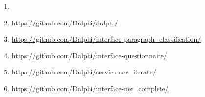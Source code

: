   \begin{enumerate}
    \item {}
    \item \url{https://github.com/Dalphi/dalphi/} \\
    \item \url{https://github.com/Dalphi/interface-paragraph_classification/} \\
    \item \url{https://github.com/Dalphi/interface-questionnaire/} \\
    \item \url{https://github.com/Dalphi/service-ner_iterate/} \\
    \item \url{https://github.com/Dalphi/interface-ner_complete/} \\
  \end{enumerate}

